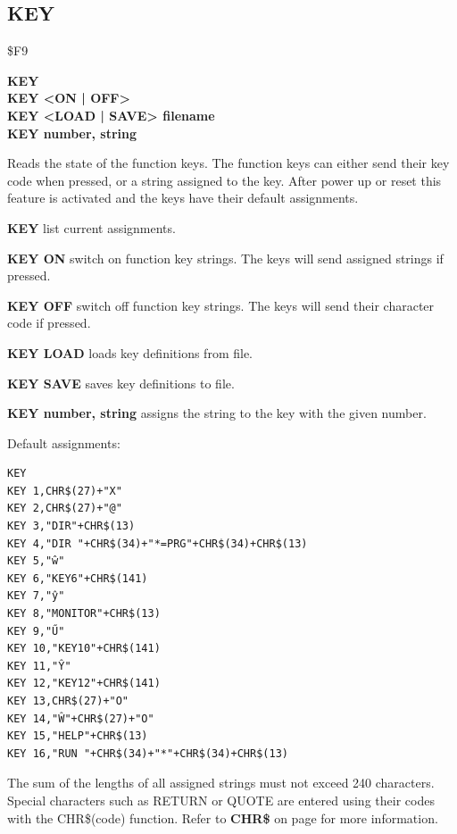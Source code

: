 \subsection{KEY}
\begin{description}[leftmargin=2cm,style=nextline]
\item [Token:] \$F9
\item [Format:] {\bf KEY } \\
		{\bf KEY <ON | OFF>} \\
		{\bf KEY <LOAD | SAVE> filename} \\
		{\bf KEY number, string}
\item [Usage:] Reads the state of the function keys.
               The function keys can either send their key code
               when pressed, or a string assigned to the key.
               After power up or reset this feature is activated
               and the keys have their default assignments.

               {\bf KEY} list current assignments.

               {\bf KEY ON} switch on function key strings.
               The keys will send assigned strings if pressed.

               {\bf KEY OFF} switch off function key strings.
               The keys will send their character code if pressed.

               {\bf KEY LOAD} loads key definitions from file.

               {\bf KEY SAVE} saves key definitions to file.

               {\bf KEY number, string} assigns the string to
               the key with the given number.

               Default assignments:

\begin{tcolorbox}[colback=black,coltext=white]
\verbatimfont{\codefont}
\begin{verbatim}
KEY
KEY 1,CHR$(27)+"X"
KEY 2,CHR$(27)+"@"
KEY 3,"DIR"+CHR$(13)
KEY 4,"DIR "+CHR$(34)+"*=PRG"+CHR$(34)+CHR$(13)
KEY 5,"ŵ"
KEY 6,"KEY6"+CHR$(141)
KEY 7,"ŷ"
KEY 8,"MONITOR"+CHR$(13)
KEY 9,"Ű"
KEY 10,"KEY10"+CHR$(141)
KEY 11,"Ŷ"
KEY 12,"KEY12"+CHR$(141)
KEY 13,CHR$(27)+"O"
KEY 14,"Ŵ"+CHR$(27)+"O"
KEY 15,"HELP"+CHR$(13)
KEY 16,"RUN "+CHR$(34)+"*"+CHR$(34)+CHR$(13)
\end{verbatim}
\end{tcolorbox}

\item [Remarks:] The sum of the lengths of all assigned strings
                 must not exceed 240 characters.
                 Special characters such as RETURN or QUOTE are entered
                 using their codes with the CHR\$(code) function.
                 Refer to {\bf CHR\$} on page \pageref{chrcommand}
                 for more information.


\end{description}
